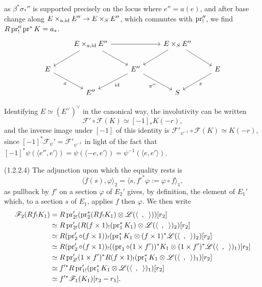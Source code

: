 \documentclass[deligne.tex]{subfiles}
\begin{document}
as $\beta^*\sigma_*''$ is supported precisely on the locus where $e''=a(e)$,
and after base change along $E\times_{a,\operatorname{id}}E''\rightarrow E\times_SE''$, which
commutes with $\operatorname{pr}_!''$, we find $R\operatorname{pr}_!''\operatorname{pr}^*K=a_*$.
\begin{equation*}\begin{tikzcd}
	&E\times_{a,\id}E''\arrow[dl]\arrow[dr]\arrow[rr]&&E\times_SE''\arrow[dl]\arrow[dr] \\
	E\arrow[dr,"a"']&&E''\arrow[dl,"\id"]\arrow[dr,"\pi''"']&&E\arrow[dl,"\pi"] \\
	&E''&&S
\end{tikzcd}\end{equation*}

\begin{remark}\label{laumon:1.2.2.1rmk}
	Identifying $E\simeq (E^\vee)^\vee$ in the canonical way,
	the involutivity can be written
	\begin{equation*}
		\mathscr F'\circ\mathscr F(K)\simeq [-1]_*K(-r),
	\end{equation*}
	and the inverse image under $[-1]$ of this identity is
	$\mathscr F'_{\psi^{-1}}\circ\mathscr F(K)\simeq K(-r)$, since
	$[-1]^*\mathscr F_{\psi}'=\mathscr F'_{\psi^{-1}}$ in light of the fact 
	that $[-1]^*\psi(\langle e'',e'\rangle)=\psi(\langle-e,e'\rangle)=\psi^{-1}(\langle e,e'\rangle)$.
\end{remark}



(1.2.2.4) The adjunction upon which the equality rests is
\begin{equation*}
	\langle f(s),\varphi \rangle_2=\langle s,f'^*\varphi:=\varphi\circ f\rangle_1,
\end{equation*}
as pullback by $f'$ on a section $\varphi$ of $E_2'$ gives, by definition, 
the element of $E_1'$ which, to a section $s$ of $E_1$, applies $f$ then $\varphi$. We then write
\begin{align*}
	\mathscr F_2(Rf_!K_1)
	&=R\operatorname{pr}_{2!}'(\operatorname{pr}_2^*(Rf_!K_1)\otimes\mathscr L(\langle\enskip,\enskip\rangle))[r_2] \\
	&\simeq R\operatorname{pr}_{2!}'(R(f\times1)_!(\operatorname{pr}_1^*K_1)\otimes\mathscr L(\langle\enskip,\enskip\rangle)_2)[r_2] \\
	&\simeq R(\operatorname{pr}_2'\circ (f\times1))_!(\operatorname{pr}_1^*K_1\otimes(f\times1)^*\mathscr L(\langle\enskip,\enskip\rangle)_2)[r_2] \\
	&\simeq R(\operatorname{pr}_2'\circ (f\times1))_!((\operatorname{pr}_1\circ(1\times f'))^*K_1\otimes(1\times f')^*\mathscr L(\langle\enskip,\enskip\rangle)_1)[r_2] \\
	&\simeq R\operatorname{pr}_{2!}'(1\times f')^*R(f\times1)_!(\operatorname{pr}_1^*K_1\otimes\mathscr L(\langle\enskip,\enskip\rangle)_1)[r_2] \\
	&\simeq f'^*R\operatorname{pr}_{1!}'(\operatorname{pr}_1^*K_1\otimes\mathscr L(\langle\enskip,\enskip\rangle)_1)[r_2] \\
	&\simeq f'^*\mathscr F_1(K_1)[r_2-r_1].
\end{align*}
\end{document}
